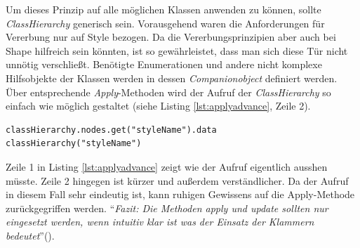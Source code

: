 Um dieses Prinzip auf alle möglichen Klassen anwenden zu können, sollte \textit{ClassHierarchy} generisch sein. Vorausgehend waren die Anforderungen für Vererbung nur auf Style bezogen. Da die Vererbungsprinzipien aber auch bei Shape hilfreich sein könnten, ist so gewährleistet, dass man sich diese Tür nicht unnötig verschließt. 
Benötigte Enumerationen und andere nicht komplexe Hilfsobjekte der Klassen werden in dessen \textit{Companionobject} definiert werden. 
Über entsprechende \textit{Apply}-Methoden wird der Aufruf der \textit{ClassHierarchy} so einfach wie möglich gestaltet (siehe Listing \ref{lst:applyadvance}, Zeile 2).
\begin{lstlisting}[style=scala, caption = {Beispielhafte Vereinfachung durch Apply Methode}, label = {lst:applyadvance}]
classHierarchy.nodes.get("styleName").data
classHierarchy("styleName")
\end{lstlisting}Zeile 1 in Listing \ref{lst:applyadvance} zeigt wie der Aufruf eigentlich ausshen müsste. Zeile 2 hingegen ist kürzer und außerdem verständlicher.
Da der Aufruf in diesem Fall sehr eindeutig ist, kann ruhigen Gewissens auf die Apply-Methode zurückgegriffen werden. "`\textit{Fazit: Die Methoden apply und update sollten nur eingesetzt werden, wenn intuitiv klar ist was der Einsatz der Klammern bedeutet}"'().

